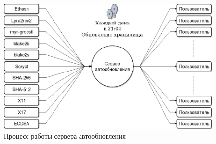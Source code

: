 \begin{figure}[h]
    \centering
    \includegraphics[width=\textwidth]{images/server}
    \caption{Процесс работы сервера автообновления}\label{update}
\end{figure}
